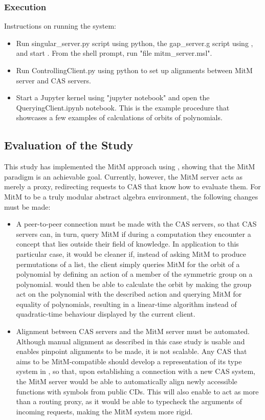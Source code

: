 \subsubsection{Execution}
Instructions on running the system:
\begin{itemize}
  \item Run singular\_server.py script using python, the gap\_server.g script
    using \GAP, and start \MMT. From the \MMT shell prompt, run 
    "file mitm\_server.msl".
  \item Run ControllingClient.py using python to set up alignments between
    MitM server and CAS servers.
  \item Start a Jupyter kernel using "jupyter notebook" and open the 
    QueryingClient.ipynb notebook. This is the example procedure that showcases
    a few examples of calculations of orbits of polynomials.
\end{itemize}

\subsection{Evaluation of the Study}
This study has implemented the MitM approach using \SCSCP, showing that the MitM 
paradigm is an achievable goal. Currently, however, the MitM server acts as 
merely a proxy, redirecting \SCSCP requests to CAS that know how to evaluate them.
For MitM to be a truly modular abstract algebra environment, the following
changes must be made:
\begin{itemize}
  \item A peer-to-peer connection must be made with the CAS servers, so that
    CAS servers can, in turn, query MitM if during a computation they encounter 
    a concept that lies outside their field of knowledge. In application to
    this particular case, it would be cleaner if, instead of asking MitM to 
    produce permutations of a list, the client simply queries MitM for the orbit 
    of a polynomial by defining an action of a member of the symmetric group on a 
    polynomial. \GAP would then be able to calculate the orbit by making the group 
    act on the polynomial with the described action and querying MitM for 
    equality of polynomials, resulting in a linear-time algorithm instead of
    quadratic-time behaviour displayed by the current client.
  \item Alignment between CAS servers and the MitM server must be automated.
    Although manual alignment as described in this case study is usable and
    enables pinpoint alignments to be made, it is not scalable. Any CAS that aims
    to be MitM-compatible should develop a representation of its type system
    in \MMT, so that, upon establishing a connection with a new CAS system, the 
    MitM server would be able to automatically align newly accessible functions 
    with symbols from public CDs. This will also enable \MMT to act as more than
    a routing proxy, as it would be able to typecheck the arguments of incoming
    requests, making the MitM system more rigid.
\end{itemize}

